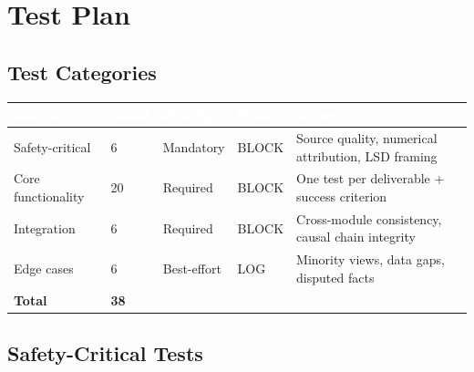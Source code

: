 \documentclass[11pt,letterpaper]{article}
\newcommand{\tableheader}[1]{\textbf{\sffamily\textcolor{white}{#1}}}
\begin{document}
\section{Test Plan}

\subsection{Test Categories}

\begin{center}
\begin{tabularx}{\textwidth}{L{3cm}C{1.5cm}C{2cm}C{2cm}X}
\toprule
{}
\tableheader{Category} & \tableheader{Count} & \tableheader{Priority} & \tableheader{Failure} & \tableheader{Scope} \\
\midrule
Safety-critical & 6 & Mandatory & BLOCK & Source quality, numerical attribution, LSD framing \\
Core functionality & 20 & Required & BLOCK & One test per deliverable + success criterion \\
Integration & 6 & Required & BLOCK & Cross-module consistency, causal chain integrity \\
Edge cases & 6 & Best-effort & LOG & Minority views, data gaps, disputed facts \\
\midrule
{}
\textbf{Total} & \textbf{38} & & & \\
\bottomrule
\end{tabularx}
\end{center}

\subsection{Safety-Critical Tests}
\end{document}
